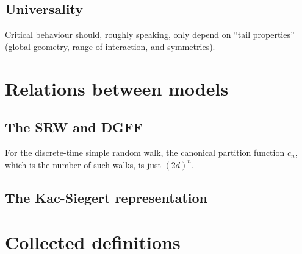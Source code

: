 

\subsection{Universality}

Critical behaviour should, roughly speaking, only depend on ``tail properties''
(global geometry, range of interaction, and symmetries).


\section{Relations between models}


\subsection{The SRW and DGFF}


For the discrete-time simple random walk, the canonical partition function $c_n$,
which is the number of such walks, is just $(2 d)^n$.


\subsection{The Kac-Siegert representation}




\pagebreak

\section{Collected definitions}

